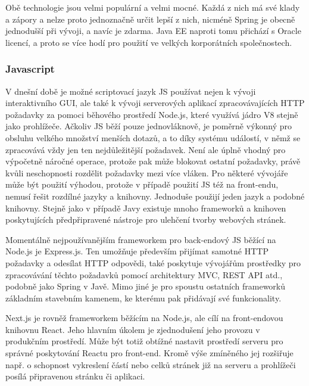 		Obě technologie jsou velmi populární a velmi mocné.
		Každá z nich má své klady a zápory a nelze proto jednoznačně určit lepší z nich, nicméně Spring je obecně jednodušší při
		vývoji, a navíc je zdarma.
		Java EE naproti tomu přichází s Oracle licencí, a proto se více hodí pro použití ve velkých korporátních
		společnostech. \cite{java_ee_vs_spring}

		\subsubsection{Javascript}

		V dnešní době je možné scriptovací jazyk \ac{JS} používat nejen k vývoji interaktivního \Ac{GUI},
		ale také k vývoji serverových aplikací zpracovávajících \Ac{HTTP} požadavky za pomoci běhového prostředí Node.js,
		které využívá jádro V8 stejně jako prohlížeče. \cite{express_node_introduction}
		Ačkoliv \ac{JS} běží pouze jednovláknově, je poměrně výkonný pro obsluhu velkého množství menších dotazů, a to díky
		systému událostí, v němž se zpracovává vždy jen ten nejdůležitější požadavek.
		Není ale úplně vhodný pro výpočetně náročné operace, protože pak může blokovat ostatní požadavky, právě kvůli
		neschopnosti rozdělit požadavky mezi více vláken. \cite{js_eventloop}
		Pro některé vývojáře může být použití výhodou, protože v případě použití \ac{JS} též na front-endu,
		nemusí řešit rozdílné jazyky a knihovny.
		Jednoduše použijí jeden jazyk a podobné knihovny.
		Stejně jako v případě Javy existuje mnoho frameworků a knihoven poskytujících předpřipravené nástroje pro ulehčení
		tvorby webových stránek.

		Momentálně nejpoužívanějším frameworkem pro back-endový \ac{JS} běžící na Node.js je Express.js. \cite{state_of_js_2020}
		Ten umožňuje především přijímat samotné \Ac{HTTP} požadavky a odesílat \Ac{HTTP} odpovědi, také poskytuje vývojářům
		prostředky pro zpracovávání těchto požadavků pomocí architektury \Ac{MVC}, \Ac{REST} API atd., podobně
		jako Spring v Javě.
		Mimo jiné je pro spoustu ostatních frameworků základním stavebním kamenem, ke kterému pak přidávají
		své funkcionality. \cite{express_node_introduction}

		Next.js je rovněž frameworkem běžícím na Node.js, ale cílí na front-endovou knihovnu React.
		Jeho hlavním úkolem je zjednodušení jeho provozu v produkčním prostředí.
		Může být totiž obtížné nastavit prostředí serveru pro správné poskytování Reactu pro front-end.
		Kromě výše zmíněného jej rozšiřuje např. o schopnost vykreslení částí nebo celků stránek již na serveru a
		prohlížeči posílá připravenou stránku či aplikaci. \cite{create_nextjs_app}

